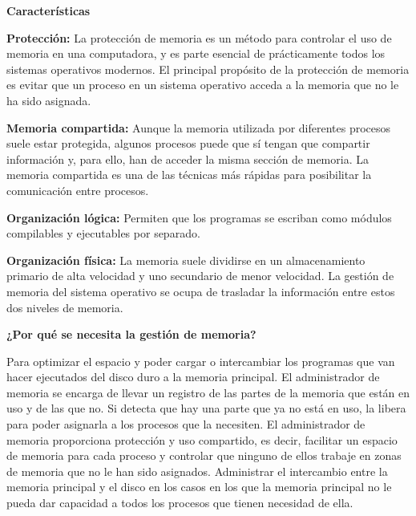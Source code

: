 \documentclass{article}
\begin{document}
\Large\textbf{Características}\newline

\normalsize\textbf{Protección:}
La protección de memoria es un método para controlar el uso de memoria en una computadora, y es parte esencial de prácticamente todos los sistemas operativos modernos. El principal propósito de la protección de memoria es evitar que un proceso en un sistema operativo acceda a la memoria que no le ha sido asignada.\newline

\textbf{Memoria compartida:}
Aunque la memoria utilizada por diferentes procesos suele estar protegida, algunos procesos puede que sí tengan que compartir información y, para ello, han de acceder la misma sección de memoria. La memoria compartida es una de las técnicas más rápidas para posibilitar la comunicación entre procesos.\newline

\textbf{Organización lógica:}
Permiten que los programas se escriban como módulos compilables y ejecutables por separado.\newline

\textbf{Organización física:}
La memoria suele dividirse en un almacenamiento primario de alta velocidad y uno secundario de menor velocidad.  La gestión de memoria del sistema operativo se ocupa de trasladar la información entre estos dos niveles de memoria.\newline

\textbf{¿Por qué se necesita la gestión de memoria?}\newline

Para optimizar el espacio y poder cargar o intercambiar los programas que van hacer ejecutados del disco duro a la memoria principal.\newline
El administrador de memoria se encarga de llevar un registro de las partes de la memoria que están en uso y de las que no. Si detecta que hay una parte que ya no está en uso, la libera para poder asignarla a los procesos que la necesiten.
El administrador de memoria proporciona protección y uso compartido, es decir, facilitar un espacio de memoria para cada proceso y controlar que ninguno de ellos trabaje en zonas de memoria que no le han sido asignados.\newline
Administrar el intercambio entre la memoria principal y el disco en los casos en los que la memoria principal no le pueda dar capacidad a todos los procesos que tienen necesidad de ella.\cite{Sistemas}
\end{document}
